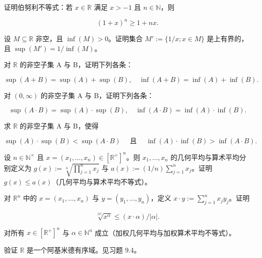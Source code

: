 \begin{exercises}
\item

证明伯努利不等式：若 $ x \in \mathbb{R} $ 满足 $ x > -1 $ 且 $ n \in \mathbb{N} $，则

\[
(1+x)^{n}\geq1+nx.
\]
\item

设 $ M \subseteq \mathbb{R} $ 非空，且 $ \inf(M) > 0 $。证明集合 $ M' := \{1/x; x \in M\} $ 是上有界的，且 $ \sup(M') = 1/\inf(M) $。

\item

对 $ \mathbb{R} $ 的非空子集 A 与 B，证明下列各条：

\[
\sup(A+B)=\sup(A)+\sup(B),\quad\inf(A+B)=\inf(A)+\inf(B).
\]
\item

\begin{items}
\item

对 $ (0,\infty) $ 的非空子集 A 与 B，证明下列各条：

\[
\sup(A\cdot B)=\sup(A)\cdot\sup(B),\quad\inf(A\cdot B)=\inf(A)\cdot\inf(B).
\]
\item

求 $ \mathbb{R} $ 的非空子集 A 与 B，使得

\[
\sup(A)\cdot\sup(B)<\sup(A\cdot B)\quad\text{ 且 }\quad\inf(A)\cdot\inf(B)>\inf(A\cdot B).
\]
\end{items}

\item

设 $ n \in \mathbb{N}^\times $ 且 $ x = (x_1, \ldots, x_n) \in [\mathbb{R}^+]^n $。则 $ x_1, \ldots, x_n $ 的几何平均与算术平均分别定义为 $ g(x) := \sqrt[n]{\prod_{j=1}^{n} x_j} $ 与 $ a(x) := (1/n) \sum_{j=1}^{n} x_j $。证明 $ g(x) \leq a(x) $（几何平均与算术平均不等式）。

\item

对 $ \mathbb{R}^n $ 中的 $ x = (x_1, \ldots, x_n) $ 与 $ y = (y_1, \ldots, y_n) $，定义 $ x \cdot y := \sum_{j=1}^n x_j y_j $。证明

\[
\sqrt[|\alpha|]{x^{\alpha}}\leq(x\cdot\alpha)/|\alpha|.
\]

对所有 $ x \in [\mathbb{R}^+]^n $ 与 $ \alpha \in \mathbb{N}^n $ 成立（加权几何平均与加权算术平均不等式）。

\item

验证 $ \mathbb{R} $ 是一个阿基米德有序域。见习题 9.4。


\end{exercises}
